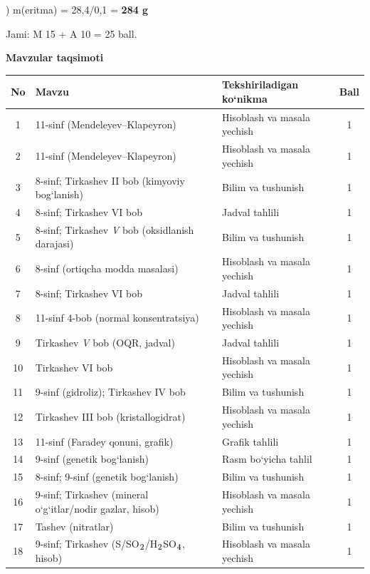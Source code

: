 \documentclass[11pt,a4paper]{article}
\renewcommand{\textsubscript}[1]{\ensuremath{_{\text{\fontsize{8}{8}\selectfont #1}}}}
\begin{document}
) m(eritma) = 28,4/0,1 = \textbf{284 g}\par
\noindent Jami: M 15 + A 10 = 25 ball.\par
\par\bigskip\noindent\textbf{Mavzular taqsimoti}\par\smallskip
{\small\noindent\begin{longtable}{|c|p{7.2cm}|p{5.4cm}|c|}\hline \textbf{No} & \textbf{Mavzu} & \textbf{Tekshiriladigan ko`nikma} & \textbf{Ball}\\\hline
1 & 11-sinf (Mendeleyev--Klapeyron) & Hisoblash va masala yechish & 1\\\hline
2 & 11-sinf (Mendeleyev--Klapeyron) & Hisoblash va masala yechish & 1\\\hline
3 & 8-sinf; Tirkashev II bob (kimyoviy bog`lanish) & Bilim va tushunish & 1\\\hline
4 & 8-sinf; Tirkashev VI bob & Jadval tahlili & 1\\\hline
5 & 8-sinf; Tirkashev \textit{V} bob (oksidlanish darajasi) & Bilim va tushunish & 1\\\hline
6 & 8-sinf (ortiqcha modda masalasi) & Hisoblash va masala yechish & 1\\\hline
7 & 8-sinf; Tirkashev VI bob & Jadval tahlili & 1\\\hline
8 & 11-sinf 4-bob (normal konsentratsiya) & Hisoblash va masala yechish & 1\\\hline
9 & Tirkashev \textit{V} bob (OQR, jadval) & Jadval tahlili & 1\\\hline
10 & Tirkashev VI bob & Hisoblash va masala yechish & 1\\\hline
11 & 9-sinf (gidroliz); Tirkashev IV bob & Bilim va tushunish & 1\\\hline
12 & Tirkashev III bob (kristallogidrat) & Hisoblash va masala yechish & 1\\\hline
13 & 11-sinf (Faradey qonuni, grafik) & Grafik tahlili & 1\\\hline
14 & 9-sinf (genetik bog`lanish) & Rasm bo`yicha tahlil & 1\\\hline
15 & 8-sinf; 9-sinf (genetik bog`lanish) & Bilim va tushunish & 1\\\hline
16 & 9-sinf; Tirkashev (mineral o`g`itlar/nodir gazlar, hisob) & Hisoblash va masala yechish & 1\\\hline
17 & Tashev (nitratlar) & Bilim va tushunish & 1\\\hline
18 & 9-sinf; Tirkashev (S/SO\textsubscript{2}/H\textsubscript{2}SO\textsubscript{4}, hisob) & Hisoblash va masala yechish & 1\\\hline

\end{longtable}}
\end{document}
